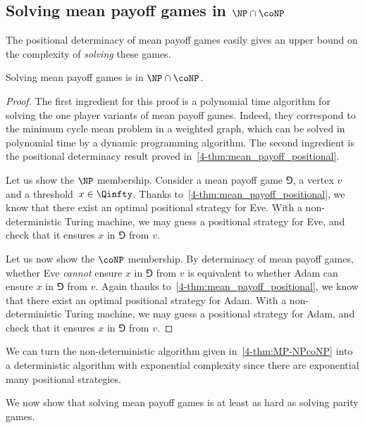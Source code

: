 \subsection*{\texorpdfstring{Solving mean payoff games in $\NP\cap\coNP$}{Solving mean payoff games in NP and coNP}}
The positional determinacy of mean payoff games easily gives an upper bound on the complexity of \emph{solving} these games.

\begin{theorem}
\label{4-thm:MP-NPcoNP}
Solving mean payoff games is in $\NP\cap\coNP$.
\end{theorem}
\begin{proof}
The first ingredient for this proof is a polynomial time algorithm for solving the one player variants of mean payoff games.
Indeed, they correspond to the minimum cycle mean problem in a weighted graph,
which can be solved in polynomial time by a dynamic programming algorithm.
The second ingredient is the positional determinacy result proved in~\cref{4-thm:mean_payoff_positional}.

Let us show the $\NP$ membership. 
Consider a mean payoff game $\Game$, a vertex $v$ and a threshold~$x \in \Qinfty$.
Thanks to~\cref{4-thm:mean_payoff_positional}, we know that there exist an optimal positional strategy for Eve.
With a non-deterministic Turing machine, we may guess a positional strategy for Eve, and check that it ensures $x$ in $\Game$ from $v$. 

Let us now show the $\coNP$ membership. 
By determinacy of mean payoff games, whether Eve \emph{cannot} ensure $x$ in $\Game$ from $v$ 
is equivalent to whether Adam can ensure $x$ in $\Game$ from $v$.
Again thanks to~\cref{4-thm:mean_payoff_positional}, we know that there exist an optimal positional strategy for Adam.
With a non-deterministic Turing machine, we may guess a positional strategy for Adam, and check that it ensures $x$ in $\Game$ from $v$. 
\end{proof}

We can turn the non-deterministic algorithm given in~\cref{4-thm:MP-NPcoNP} into a deterministic algorithm 
with exponential complexity since there are exponential many positional strategies.

We now show that solving mean payoff games is at least as hard as solving parity games.

